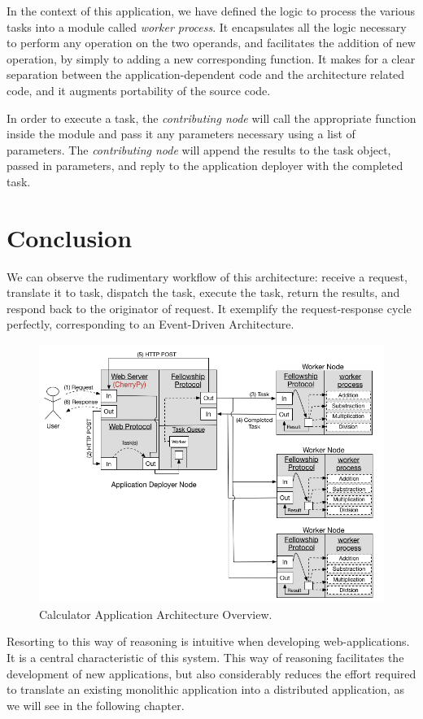 \documentclass[12pt, titlepage]{uo_temp}
\begin{document}
     In the context of this application, we have defined the logic to process the various
     tasks into a module called \emph{worker process}. It encapsulates all the logic
     necessary to perform any operation on the two operands, and facilitates the addition
     of new operation, by simply to adding a new corresponding function. It makes for a
     clear separation between the application-dependent code and the architecture related
     code, and it augments portability of the source code.

     In order to execute a task, the \emph{contributing node} will call the appropriate
     function inside the module and pass it any parameters necessary using a list of
     parameters. The \emph{contributing node} will append the results to the task object,
     passed in parameters, and reply to the application deployer with the completed task.
         
     \section{Conclusion}
     We can observe the rudimentary workflow of this architecture: receive a request,
     translate it to task, dispatch the task, execute the task, return the results, and
     respond back to the originator of request. It exemplify the request-response cycle
     perfectly, corresponding to an Event-Driven Architecture.
     \begin{figure}[h!]
       \centering
       \includegraphics[width=150mm]{images/calculator.png}
       \caption{Calculator Application Architecture Overview.}
     \end{figure}
     Resorting to this way of reasoning is intuitive when developing web-applications. It
     is a central characteristic of this system. This way of reasoning facilitates the
     development of new applications, but also considerably reduces the effort required to
     translate an existing monolithic application into a distributed application, as we
     will see in the following chapter.
     
\end{document}
